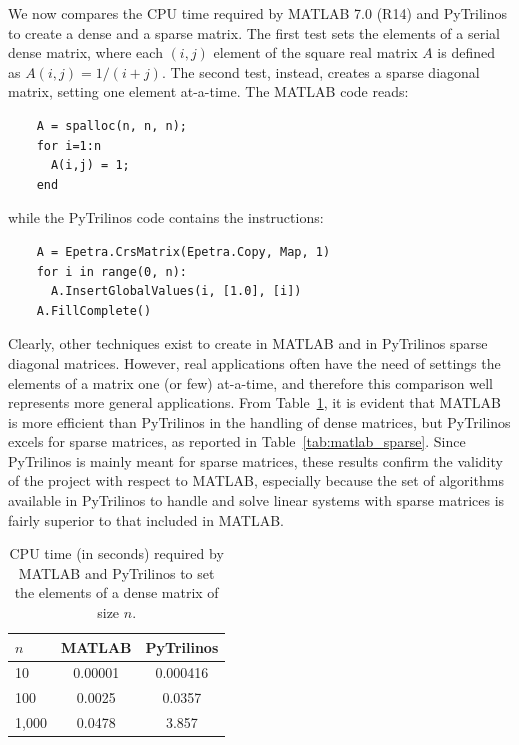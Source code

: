 \documentclass[acmtocl]{acmtrans2m}
\begin{document}
We now compares the CPU time required by MATLAB 7.0 (R14) and
PyTrilinos to create a dense and a sparse matrix.
The first test sets the elements
of a serial dense matrix, where each $(i,j)$ element of the square real
matrix $A$ is defined as $A(i,j) = 1/(i + j)$. The second test,
instead, creates a sparse diagonal matrix, setting one element
at-a-time. The MATLAB code reads:
\begin{verbatim}
    A = spalloc(n, n, n);
    for i=1:n
      A(i,j) = 1;
    end
\end{verbatim}
while the PyTrilinos code contains the instructions:
\begin{verbatim}
    A = Epetra.CrsMatrix(Epetra.Copy, Map, 1)
    for i in range(0, n):
      A.InsertGlobalValues(i, [1.0], [i])
    A.FillComplete()
\end{verbatim}
Clearly, other techniques exist to create in MATLAB and in
PyTrilinos sparse diagonal matrices. However, real applications
often have the need of settings the elements of a matrix one (or
few) at-a-time, and therefore this comparison well represents more
general applications. From Table~\ref{tab:matlab_dense},
  it is evident that MATLAB is more efficient than PyTrilinos in the handling
  of dense matrices, but PyTrilinos excels for sparse matrices, as reported in
  Table~\ref{tab:matlab_sparse}. Since PyTrilinos is mainly meant for sparse
  matrices, these results confirm the validity of the project with respect to
  MATLAB, especially because the set of algorithms available in PyTrilinos to
  handle and solve linear systems with sparse matrices is fairly superior to
  that included in MATLAB.

\begin{table}
\begin{center}
\begin{tabular}{| l | c | c |}
\hline
$n$ & MATLAB & PyTrilinos \\
\hline
\hline
10     & 0.00001 & 0.000416 \\
100    & 0.0025 & 0.0357 \\
1,000  & 0.0478 & 3.857 \\
\hline
\end{tabular}
\caption{CPU time (in seconds) required by MATLAB and PyTrilinos to set the
  elements of a  dense matrix of size $n$.}
\label{tab:matlab_dense}
\end{center}
\end{table}
\end{document}

